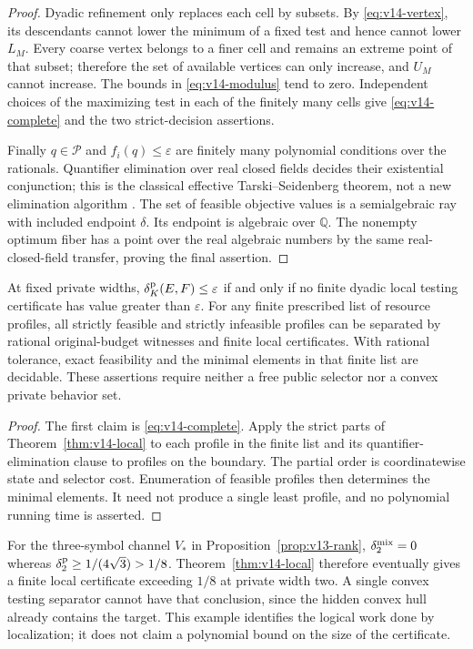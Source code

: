 \begin{proof}
Dyadic refinement only replaces each cell by subsets. By
\eqref{eq:v14-vertex}, its descendants cannot lower the minimum of a
fixed test and hence cannot lower $L_M$. Every coarse vertex belongs
to a finer cell and remains an extreme point of that subset; therefore
the set of available vertices can only increase, and $U_M$ cannot
increase. The bounds in \eqref{eq:v14-modulus} tend to zero. Independent
choices of the maximizing test in each of the finitely many cells give
\eqref{eq:v14-complete} and the two strict-decision assertions.

Finally $q\in\mathcal P$ and $f_i(q)\le\varepsilon$ are finitely many
polynomial conditions over the rationals. Quantifier elimination over
real closed fields decides their existential conjunction; this is the
classical effective Tarski--Seidenberg theorem, not a new elimination
algorithm \cite[\S2.1, Theorem 2.1]{Basu2014}. The set of feasible
objective values is a semialgebraic ray with included endpoint $\delta$.
Its endpoint is algebraic over $\mathbb Q$. The nonempty optimum fiber
has a point over the real algebraic numbers by the same real-closed-field
transfer, proving the final assertion.
\end{proof}

\begin{corollary}
\label{cor:v14-converse}
At fixed private widths, $\delta^{\rm p}_K(E,F)\le\varepsilon$ if and only if no
finite dyadic local testing certificate has value greater than
$\varepsilon$. For any finite prescribed list of resource profiles, all
strictly feasible and strictly infeasible profiles can be separated by
rational original-budget witnesses and finite local certificates.
With rational tolerance, exact feasibility and the minimal elements in
that finite list are decidable. These assertions require neither a free
public selector nor a convex private behavior set.
\end{corollary}
\begin{proof}
The first claim is \eqref{eq:v14-complete}. Apply the strict parts of
Theorem~\ref{thm:v14-local} to each profile in the finite list and its
quantifier-elimination clause to profiles on the boundary. The partial
order is coordinatewise state and selector cost. Enumeration of feasible
profiles then determines the minimal elements. It need not produce a
single least profile, and no polynomial running time is asserted.
\end{proof}

For the three-symbol channel $V_*$ in Proposition~\ref{prop:v13-rank},
$\delta^{\rm mix}_2=0$ whereas $\delta^{\rm p}_2\ge1/(4\sqrt3)>1/8$.
Theorem~\ref{thm:v14-local} therefore eventually gives a finite local
certificate exceeding $1/8$ at private width two. A single convex
testing separator cannot have that conclusion, since the hidden
convex hull already contains the target. This example identifies the
logical work done by localization; it does not claim a polynomial
bound on the size of the certificate.

